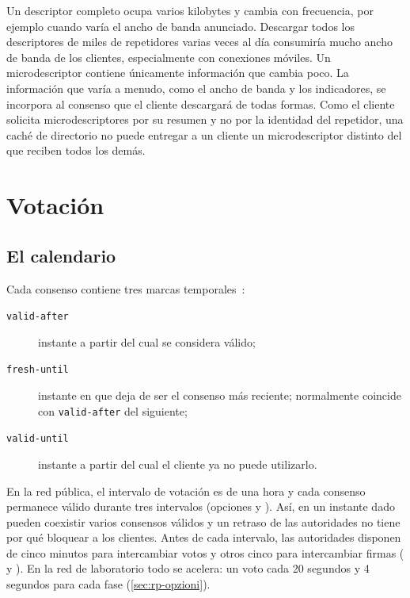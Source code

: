 \begin{approfondimento}
Un descriptor completo ocupa varios kilobytes y cambia con frecuencia, por ejemplo cuando varía el ancho de banda anunciado. Descargar todos los descriptores de miles de repetidores varias veces al día consumiría mucho ancho de banda de los clientes, especialmente con conexiones móviles. Un microdescriptor contiene únicamente información que cambia poco. La información que varía a menudo, como el ancho de banda y los indicadores, se incorpora al consenso que el cliente descargará de todas formas. Como el cliente solicita microdescriptores por su resumen y no por la identidad del repetidor, una caché de directorio no puede entregar a un cliente un microdescriptor distinto del que reciben todos los demás.
\end{approfondimento}

\section{Votación}\label{sec:dir-voto}

\subsection{El calendario}

Cada consenso contiene tres marcas temporales~:
\begin{description}
  \item[\texttt{valid-after}] instante a partir del cual se considera válido;
  \item[\texttt{fresh-until}] instante en que deja de ser el consenso más reciente; normalmente coincide con \texttt{valid-after} del siguiente;
  \item[\texttt{valid-until}] instante a partir del cual el cliente ya no puede utilizarlo.
\end{description}

En la red pública, el intervalo de votación es de una hora y cada consenso permanece válido durante tres intervalos (opciones  y ). Así, en un instante dado pueden coexistir varios consensos válidos y un retraso de las autoridades no tiene por qué bloquear a los clientes. Antes de cada intervalo, las autoridades disponen de cinco minutos para intercambiar votos y otros cinco para intercambiar firmas ( y ). En la red de laboratorio todo se acelera: un voto cada 20 segundos y 4 segundos para cada fase (\cref{sec:rp-opzioni}).

